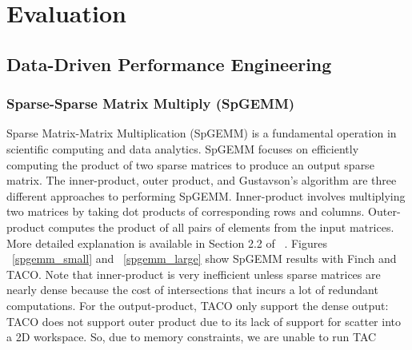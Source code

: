 
\section{Evaluation}

\subsection{Data-Driven Performance Engineering}
\subsubsection{Sparse-Sparse Matrix Multiply (SpGEMM)}

Sparse Matrix-Matrix Multiplication (SpGEMM) is a fundamental operation in scientific computing and data analytics. SpGEMM focuses on efficiently computing the product of two sparse matrices to produce an output sparse matrix.
The inner-product, outer product, and Gustavson's algorithm are three different approaches to performing SpGEMM. 
Inner-product involves multiplying two matrices by taking dot products of corresponding rows and columns.
Outer-product computes the product of all pairs of elements from the input matrices.
More detailed explanation is available in Section 2.2 of ~\cite{zhang2021gamma}.
Figures ~\ref{spgemm_small} and ~\ref{spgemm_large} show SpGEMM results with Finch and TACO.
Note that inner-product is very inefficient unless sparse matrices are nearly dense because the cost of intersections that incurs a lot of redundant computations. For the output-product, TACO only support the dense output: TACO does not support outer product due to its lack of support for scatter into a 2D workspace. So, due to memory constraints, we are unable to run TAC 








